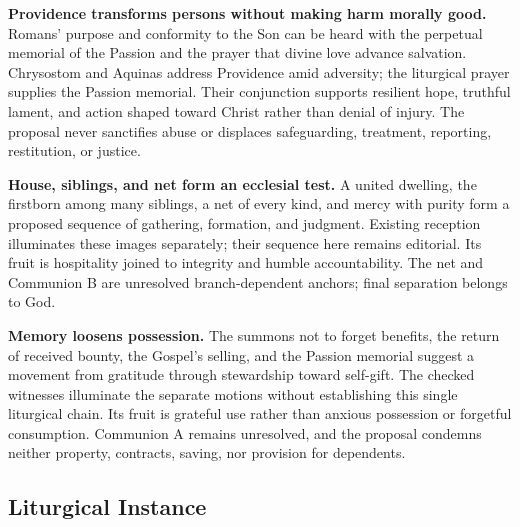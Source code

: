 \begin{deepstudy}
\noindent\textbf{Providence transforms persons without making harm morally good.\enspace{}}
Romans' purpose and conformity to the Son can be heard with the perpetual memorial of the Passion and the prayer that divine love advance salvation. Chrysostom and Aquinas address Providence amid adversity; the liturgical prayer supplies the Passion memorial. Their conjunction supports resilient hope, truthful lament, and action shaped toward Christ rather than denial of injury. The proposal never sanctifies abuse or displaces safeguarding, treatment, reporting, restitution, or justice.

\noindent\textbf{House, siblings, and net form an ecclesial test.\enspace{}}
A united dwelling, the firstborn among many siblings, a net of every kind, and mercy with purity form a proposed sequence of gathering, formation, and judgment. Existing reception illuminates these images separately; their sequence here remains editorial. Its fruit is hospitality joined to integrity and humble accountability. The net and Communion B are unresolved branch-dependent anchors; final separation belongs to God.

\noindent\textbf{Memory loosens possession.\enspace{}}
The summons not to forget benefits, the return of received bounty, the Gospel's selling, and the Passion memorial suggest a movement from gratitude through stewardship toward self-gift. The checked witnesses illuminate the separate motions without establishing this single liturgical chain. Its fruit is grateful use rather than anxious possession or forgetful consumption. Communion A remains unresolved, and the proposal condemns neither property, contracts, saving, nor provision for dependents.
\endgroup

\TriptychNotableAndQuotable
\clearpage
\pcresolutionappendix

\subsection*{Liturgical Instance}


\end{deepstudy}
